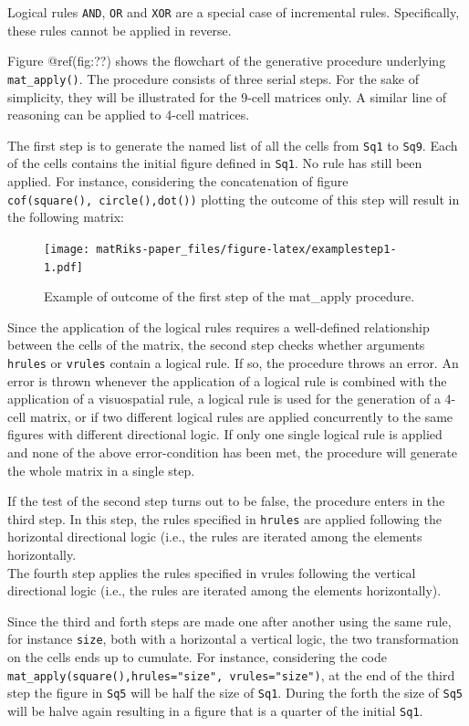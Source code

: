 Logical rules \texttt{AND}, \texttt{OR} and \texttt{XOR} are a special case of incremental rules.
Specifically, these rules cannot be applied in reverse.

Figure @ref(fig:??) shows the flowchart of the generative procedure underlying \texttt{mat\_apply()}.
The procedure consists of three serial steps.
For the sake of simplicity, they will be illustrated for the 9-cell matrices only. A similar line of reasoning can be applied to 4-cell matrices.

The first step is to generate the named list of all the cells from \texttt{Sq1} to \texttt{Sq9}.
Each of the cells contains the initial figure defined in \texttt{Sq1}. No rule has still been applied.
For instance, considering the concatenation of figure \texttt{cof(square(),\ circle(),dot())} plotting the outcome of this step will result in the following matrix:

\begin{figure}
\centering
\texttt{[image: matRiks-paper\_files/figure-latex/examplestep1-1.pdf]}
\caption{\label{fig:examplestep1}Example of outcome of the first step of the mat\_apply procedure.}
\end{figure}

Since the application of the logical rules requires a well-defined relationship between the cells of the matrix, the second step checks whether arguments \texttt{hrules} or \texttt{vrules} contain a logical rule.
If so, the procedure throws an error. An error is thrown whenever the application of a logical rule is combined with the application of a visuospatial rule, a logical rule is used for the generation of a 4-cell matrix, or if two different logical rules are applied concurrently to the same figures with different directional logic.
If only one single logical rule is applied and none of the above error-condition has been met, the procedure will generate the whole matrix in a single step.

If the test of the second step turns out to be false, the procedure enters in the third step.
In this step, the rules specified in \texttt{hrules} are applied following the horizontal directional logic (i.e., the rules are iterated among the elements horizontally.\\

The fourth step applies the rules specified in vrules following the vertical directional logic (i.e., the rules are iterated among the elements horizontally).

Since the third and forth steps are made one after another using the same rule, for instance \texttt{size}, both with a horizontal a vertical logic, the two transformation on the cells ends up to cumulate.
For instance, considering the code \texttt{mat\_apply(square(),hrules="size",\ vrules="size")}, at the end of the third step the figure in \texttt{Sq5} will be half the size of \texttt{Sq1}.
During the forth the size of \texttt{Sq5} will be halve again resulting in a figure that is a quarter of the initial \texttt{Sq1}.

